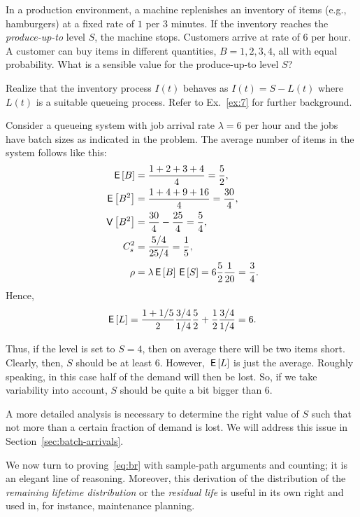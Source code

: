 \begin{exercise}
  In a production environment, a machine replenishes an inventory of
  items (e.g., hamburgers) at a fixed rate of $1$ per 3 minutes. If
  the inventory reaches the \emph{produce-up-to} level $S$, the machine stops.  Customers
  arrive at rate of 6 per hour. A customer can buy items in different
  quantities, $B=1,2,3,4$, all with equal probability. What is a
  sensible value for the produce-up-to level $S$?   
  \begin{hint}
Realize that the inventory process $I(t)$ behaves as     $I(t)=S-L(t)$ where $L(t)$ is a suitable queueing process. Refer to Ex.~\ref{ex:7} for further background.
  \end{hint}
  \begin{solution}
Consider a queueing system with job
arrival rate $\lambda=6$ per hour and the jobs have batch sizes as
indicated in the problem. The average number of items in the system
follows like this:
    \begin{align*}
      \,\mathsf{E}\left[B\right] &= \frac{1+2+3+4}{4} = \frac 52, \\
      \,\mathsf{E}\left[B^2\right] &= \frac{1+4+9+16}{4} = \frac{30}4,\\
      \,\mathsf{V}\left[B^2\right] &= \frac{30}4 - \frac{25}4 = \frac 5 4,\\
      C_s^2 &= \frac{5/4}{25/4} = \frac 15,\\
      \rho &= \lambda \,\mathsf{E}\left[B\right] \,\mathsf{E}\left[S\right] = 6 \frac 52 \frac 1{20} = \frac 34.
    \end{align*}
Hence, 
\begin{equation*}
  \,\mathsf{E}\left[L\right] = \frac {1+1/5}2 \frac{3/4}{1/4} \frac 52 + \frac 12 \frac{3/4}{1/4} = 6.
\end{equation*}

Thus, if the level is set to $S=4$, then on average there will be two
items short. Clearly, then, $S$ should be at least $6$. However,
$\,\mathsf{E}\left[L\right]$ is just the average. Roughly speaking, in this case half of
the demand will then be lost. So, if we take variability into account,
$S$ should be quite a bit bigger than 6. 

A more detailed analysis is
necessary to determine the right value of $S$ such that not more than
a certain fraction of demand is lost. We will address this issue in
Section~\ref{sec:batch-arrivals}.
  \end{solution}
\end{exercise}



We now turn to proving~\eqref{eq:br} with sample-path arguments and
counting; it is an elegant line of reasoning. Moreover, this derivation of the distribution of  the \emph{remaining lifetime   distribution} or the \emph{residual life} is useful in its own right and used in, for instance, maintenance planning. 


